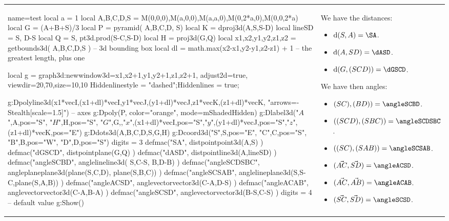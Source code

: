 \documentclass{standalone}
\begin{document}
\begin{tabular}{m{10cm}m{7cm}}
\begin{luadraw}{name=test}
local a = 1
local A,B,C,D,S = M(0,0,0),M(a,0,0),M(a,a,0),M(0,2*a,0),M(0,0,2*a)
local G = (A+B+S)/3
local P = pyramid( {A,B,C,D}, S)
local K = dproj3d(A,{S,S-D})
local lineSD = {S, D-S} 
local Q = {S, pt3d.prod(S-C,S-D)}
local H = proj3d(G,Q)
local x1,x2,y1,y2,z1,z2 = getbounds3d( {A,B,C,D,S} ) -- 3d bounding box
local dl = math.max(x2-x1,y2-y1,z2-z1) + 1 -- the greatest length, plus one

local g = graph3d:new{window3d={x1,x2+1,y1,y2+1,z1,z2+1}, adjust2d=true, viewdir={20,70},size={10,10}}
Hiddenlinestyle = "dashed";Hiddenlines = true;

g:Dpolyline3d({{x1*vecI,(x1+dl)*vecI},{y1*vecJ,(y1+dl)*vecJ},{z1*vecK,(z1+dl)*vecK}}, "arrows={-Stealth[scale=1.5]}") -- axes
g:Dpoly(P, {color="orange", mode=mShadedHidden})
 g:Dlabel3d("$A$",A,{pos="S"}, "$H$",H,{pos="S"}, "$G$",G,{},"$x$",(x1+dl)*vecI,{pos="S"},"$y$",(y1+dl)*vecJ,{pos="S"},"$z$",(z1+dl)*vecK,{pos="E"})
g:Ddots3d({A,B,C,D,S,G,H})
g:Dcoord3d("S",S,{pos="E"}, "C",C,{pos="S"}, "B",B,{pos="W"}, "D",D,{pos="S"})
digits = 3
defmac("SA", distpointpoint3d(A,S) )
defmac("dGSCD", distpointplane(G,Q) )
defmac("dASD", distpointline3d(A,lineSD) )
defmac("angleSCBD", anglelineline3d( {S,C-S}, {B,D-B}) )
defmac("angleSCDSBC", angleplaneplane3d(plane(S,C,D), plane(S,B,C)) )
defmac("angleSCSAB", anglelineplane3d({S,S-C},plane(S,A,B)) )
defmac("angleACSD", anglevectorvector3d(C-A,D-S) )
defmac("angleACAB", anglevectorvector3d(C-A,B-A) )
defmac("angleSCSD", anglevectorvector3d(B-S,C-S) )
digits = 4 -- default value
g:Show()
\end{luadraw}
&
We have the distances:
\begin{itemize}
    \item $\mathrm d(S,A) = \SA$.
    \item $\mathrm d(A, SD) = \dASD$.
    \item $\mathrm d(G,(SCD)) = \dGSCD$.
\end{itemize}
We have then angles:   
\begin{itemize} 
    \item $(SC),(BD)) = \angleSCBD$.
    \item $((SCD),(SBC)) = \angleSCDSBC$.
    \item $((SC),(SAB)) = \angleSCSAB$.
    \item $(\vec{AC},\vec{SD}) = \angleACSD$.
    \item $(\vec{AC},\vec{AB}) = \angleACAB$.
    \item $(\vec{SC},\vec{SD}) = \angleSCSD$.
\end{itemize}
\end{tabular}
\end{document}
